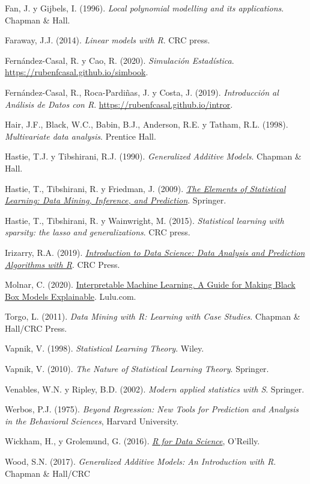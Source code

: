 \documentclass[
]{book}
\theoremstyle{break}
\theoremstyle{definition}
\theoremstyle{definition}
\theoremstyle{definition}
\theoremstyle{definition}
\theoremstyle{remark}
\begin{document}
Fan, J. y Gijbels, I. (1996). \emph{Local polynomial modelling and its applications}. Chapman \& Hall.

Faraway, J.J. (2014). \emph{Linear models with R}. CRC press.

Fernández-Casal, R. y Cao, R. (2020). \emph{Simulación Estadística}. \url{https://rubenfcasal.github.io/simbook}.

Fernández-Casal, R., Roca-Pardiñas, J. y Costa, J. (2019). \emph{Introducción al Análisis de Datos con R}. \url{https://rubenfcasal.github.io/intror}.

Hair, J.F., Black, W.C., Babin, B.J., Anderson, R.E. y Tatham, R.L. (1998). \emph{Multivariate data analysis}. Prentice Hall.

Hastie, T.J. y Tibshirani, R.J. (1990). \emph{Generalized Additive Models}. Chapman \& Hall.

Hastie, T., Tibshirani, R. y Friedman, J. (2009).
\emph{\href{https://web.stanford.edu/~hastie/ElemStatLearn}{The Elements of Statistical Learning: Data Mining, Inference, and Prediction}}. Springer.

Hastie, T., Tibshirani, R. y Wainwright, M. (2015). \emph{Statistical learning with sparsity: the lasso and generalizations}. CRC press.

Irizarry, R.A. (2019). \emph{\href{https://rafalab.github.io/dsbook}{Introduction to Data Science: Data Analysis and Prediction Algorithms with R}}. CRC Press.

Molnar, C. (2020). \href{https://christophm.github.io/interpretable-ml-book}{Interpretable Machine Learning. A Guide for Making Black Box Models Explainable}. Lulu.com.

Torgo, L. (2011). \emph{Data Mining with R: Learning with Case Studies}. Chapman \& Hall/CRC Press.

Vapnik, V. (1998). \emph{Statistical Learning Theory}. Wiley.

Vapnik, V. (2010). \emph{The Nature of Statistical Learning Theory}. Springer.

Venables, W.N. y Ripley, B.D. (2002). \emph{Modern applied statistics with S}. Springer.

Werbos, P.J. (1975). \emph{Beyond Regression: New Tools for Prediction and Analysis in the Behavioral Sciences}, Harvard University.

Wickham, H., y Grolemund, G. (2016). \emph{\href{https://r4ds.had.co.nz/}{R for Data Science}}, O'Reilly.

Wood, S.N. (2017). \emph{Generalized Additive Models: An Introduction with R}. Chapman \& Hall/CRC
\end{document}
